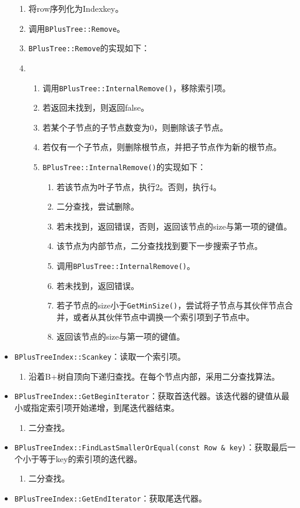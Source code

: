 \documentclass[12pt, a4paper]{article}
\def\c#1{\texttt{#1}}
\begin{document}
\begin{itemize}
\begin{enumerate}
  \item 将row序列化为Indexkey。
  \item 调用\c{BPlusTree::Remove}。
  \item \c{BPlusTree::Remove}的实现如下：
  \item \begin{enumerate}
    \item 调用\c{BPlusTree::InternalRemove()}，移除索引项。
    \item 若返回未找到，则返回false。
    \item 若某个子节点的子节点数变为0，则删除该子节点。
    \item 若仅有一个子节点，则删除根节点，并把子节点作为新的根节点。
    \item \c{BPlusTree::InternalRemove()}的实现如下：\begin{enumerate}
      \item 若该节点为叶子节点，执行2。否则，执行4。
      \item 二分查找，尝试删除。
      \item 若未找到，返回错误，否则，返回该节点的size与第一项的键值。
      \item 该节点为内部节点，二分查找找到要下一步搜索子节点。
      \item 调用\c{BPlusTree::InternalRemove()}。
      \item 若未找到，返回错误。
      \item 若子节点的size小于\c{GetMinSize()}，尝试将子节点与其伙伴节点合并，或者从其伙伴节点中调换一个索引项到子节点中。
      \item 返回该节点的size与第一项的键值。
    \end{enumerate}
  \end{enumerate}
  \end{enumerate}
  \item \c{BPlusTreeIndex::Scankey}：读取一个索引项。\begin{enumerate}
    \item 沿着B+树自顶向下递归查找。在每个节点内部，采用二分查找算法。
  \end{enumerate}
  \item \c{BPlusTreeIndex::GetBeginIterator}：获取首迭代器。该迭代器的键值从最小或指定索引项开始递增，到尾迭代器结束。
  \begin{enumerate}
    \item 二分查找。
  \end{enumerate}
  \item \c{BPlusTreeIndex::FindLastSmallerOrEqual(const Row \& key)}：获取最后一个小于等于key的索引项的迭代器。\begin{enumerate}
    \item 二分查找。
  \end{enumerate}
  \item \c{BPlusTreeIndex::GetEndIterator}：获取尾迭代器。
\end{itemize}
\end{document}
